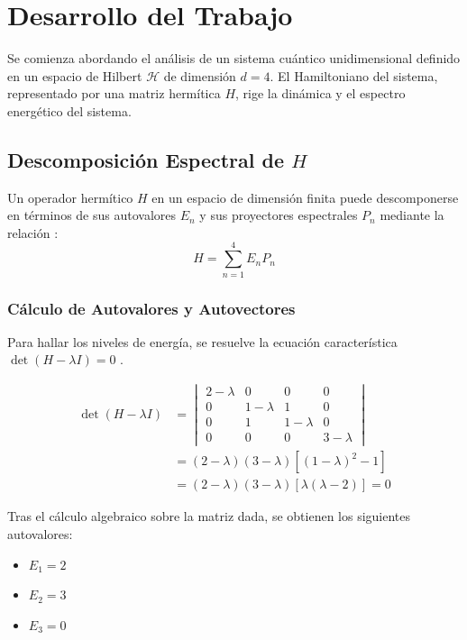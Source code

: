 \documentclass[11pt,a4paper,spanish]{book}
\begin{document}
\chapter{Desarrollo del Trabajo}

Se comienza abordando el análisis de un sistema cuántico unidimensional definido en un espacio de Hilbert $\mathcal{H}$ de dimensión $d=4$. El Hamiltoniano del sistema, representado por una matriz hermítica $H$, rige la dinámica y el espectro energético del sistema.

\section{Descomposición Espectral de $H$}

Un operador hermítico $H$ en un espacio de dimensión finita puede descomponerse en términos de sus autovalores $E_n$ y sus proyectores espectrales $P_n$ mediante la relación \citep{vonneumann1932}:
\begin{equation}
    H = \sum_{n=1}^{4} E_n P_n
\end{equation}


\subsection{Cálculo de Autovalores y Autovectores}

Para hallar los niveles de energía, se resuelve la ecuación característica $\det(H - \lambda I) = 0$ \citep{vonneumann1932}.

\begin{equation}
\begin{aligned}
\det(H - \lambda I) &= \begin{vmatrix} 2 - \lambda & 0 & 0 & 0 \\ 0 & 1 - \lambda & 1 & 0 \\ 0 & 1 & 1 - \lambda & 0 \\ 0 & 0 & 0 & 3 - \lambda \end{vmatrix} \\
  &= (2 - \lambda) (3 - \lambda) \left[(1 - \lambda)^2 - 1\right] \\
  &= (2 - \lambda) (3 - \lambda) \left[\lambda (\lambda-2) \right] = 0
\end{aligned}
\end{equation}

Tras el cálculo algebraico sobre la matriz dada, se obtienen los siguientes autovalores:

\begin{itemize}
    \item $E_1 = 2$
    \item $E_2 = 3$
    \item $E_3 = 0$
\end{itemize}
\end{document}
